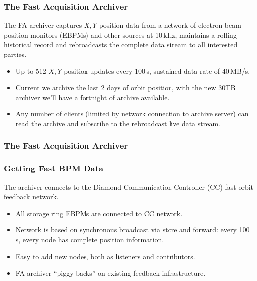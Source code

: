 \documentclass{beamer}
\begin{document}
\begin{frame}\frametitle{The Fast Acquisition Archiver}

The FA archiver captures $X,Y$ position data from a network of electron beam
position monitors (EBPMs) and other sources at 10\,kHz, maintains a rolling
historical record and rebroadcasts the complete data stream to all interested
parties.

\begin{itemize}

\item Up to 512 $X,Y$ position updates every 100\,\textmu s, sustained data
rate of 40\,MB/s.

\item Current we archive the last 2\textonehalf{} days of orbit position, with
the new 30TB archiver we'll have a fortnight of archive available.

\item Any number of clients (limited by network connection to archive server)
can read the archive and subscribe to the rebroadcast live data stream.

\end{itemize}
\end{frame}



\begin{frame}\frametitle{The Fast Acquisition Archiver}
\begin{center}

\end{center}
\end{frame}



\begin{frame}\frametitle{Getting Fast BPM Data}

The archiver connects to the Diamond Communication Controller (CC) fast orbit
feedback network.

\begin{itemize}

\item All storage ring EBPMs are connected to CC network.

\item Network is based on synchronous broadcast via store and forward: every
100\,\textmu s, every node has complete position information.

\item Easy to add new nodes, both as listeners and contributors.

\item FA archiver ``piggy backs'' on existing feedback infrastructure.

\end{itemize}

\end{frame}
\end{document}
